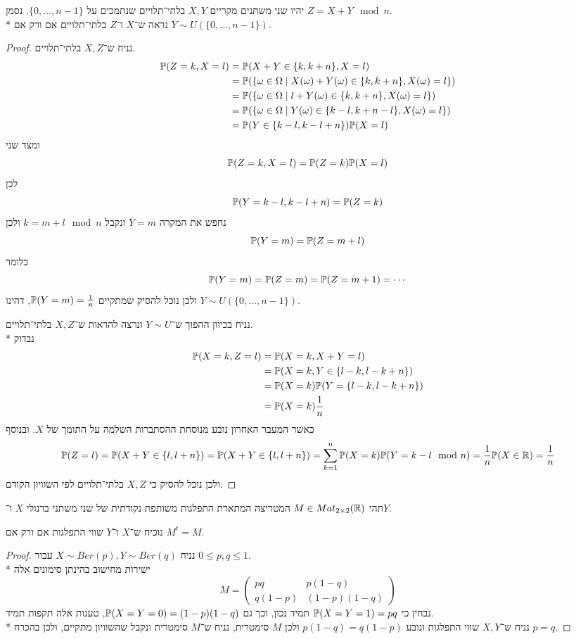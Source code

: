 \question{}
יהיו שני משתנים מקריים $X, Y$ בלתי־תלויים שנתמכים על $\{0, \dots, n - 1\}$. נסמן $Z = X + Y \mod n$. \\*
נראה ש־$X$ ו־$Z$ בלתי־תלויים אם ורק אם $Y \sim U(\{0, \dots, n - 1\})$.
\begin{proof}
	נניח ש־$X, Z$ בלתי־תלויים.
	\begin{align*}
		\mathbb{P}(Z = k, X = l)
		& = \mathbb{P}(X + Y \in \{k, k + n\}, X = l) \\
		& = \mathbb{P}(\{\omega \in \Omega \mid X(\omega) + Y(\omega) \in \{k, k + n\}, X(\omega) = l\}) \\
		& = \mathbb{P}(\{\omega \in \Omega \mid l + Y(\omega) \in \{k, k + n\}, X(\omega) = l\}) \\
		& = \mathbb{P}(\{\omega \in \Omega \mid Y(\omega) \in \{k - l, k + n - l\}, X(\omega) = l\}) \\
		& = \mathbb{P}(Y \in \{k - l, k - l + n\}) \mathbb{P}(X = l) \\
	\end{align*}
	ומצד שני
	\[
		\mathbb{P}(Z = k, X = l)
		= \mathbb{P}(Z = k) \mathbb{P}(X = l)
	\]
	לכן
	\[
		\mathbb{P}(Y = k - l, k - l + n)
		= \mathbb{P}(Z = k)
	\]
	נחפש את המקרה $Y = m$ ונקבל $k = m + l \mod n$ ולכן
	\[
		\mathbb{P}(Y = m) = \mathbb{P}(Z = m + l)
	\]
	כלומר
	\[
		\mathbb{P}(Y = m) = \mathbb{P}(Z = m) = \mathbb{P}(Z = m + 1) = \cdots
	\]
	ולכן נוכל להסיק שמתקיים $\mathbb{P}(Y = m) = \frac{1}{n}$, דהינו $Y \sim U(\{0, \dots, n - 1\})$.

	נניח בכיוון ההפוך ש־$Y \sim U$ ונרצה להראות ש־$X, Z$ בלתי־תלויים. \\*
	נבדוק
	\begin{align*}
		\mathbb{P}(X = k, Z = l)
		& = \mathbb{P}(X = k, X + Y = l) \\
		& = \mathbb{P}(X = k, Y \in \{l - k, l - k + n\}) \\
		& = \mathbb{P}(X = k) \mathbb{P}(Y = \{l - k, l - k + n\}) \\
		& = \mathbb{P}(X = k) \frac{1}{n}
	\end{align*}
	כאשר המעבר האחרון נובע מנוסחת ההסתברות השלמה על התומך של $X$.
	ובנוסף
	\[
		\mathbb{P}(Z = l)
		= \mathbb{P}(X + Y \in \{l, l + n\})
		= \mathbb{P}(X + Y \in \{l, l + n\})
		= \sum_{k = 1}^{n} \mathbb{P}(X = k) \mathbb{P}(Y = k - l \mod n)
		= \frac{1}{n} \mathbb{P}(X \in \mathbb{R})
		= \frac{1}{n}
	\]
	ולכן נוכל להסיק כי $X, Z$ בלתי־תלויים לפי השוויון הקודם.
\end{proof}

\question{}
תהי $M \in Mat_{2 \times 2}(\mathbb{R})$ המטריצה המתארת התפלגות משותפת נקודתית של שני משתני ברנולי $X$ ו־$Y$.

\subquestion{}
נוכיח ש־$X$ ו־$Y$ שווי התפלגות אם ורק אם $M^t = M$.
\begin{proof}
	נניח $X \sim Ber(p), Y \sim Ber(q)$ עבור $0 \le p, q \le 1$. \\*
	ישירות מחישוב בהינתן סימונים אלה
	\[
		M = \begin{pmatrix}
			p q & p (1 - q) \\
			q (1 - p) & (1 - p)(1 - q)
		\end{pmatrix}
	\]
	נבחין כי $\mathbb{P}(X = Y = 1) = pq$ תמיד נכון, וכך גם $\mathbb{P}(X = Y = 0) = (1 - p)(1 - q)$, טענות אלה תקפות תמיד. \\*
	נניח ש־$X, Y$ שווי התפלגות ונובע $p(1 - q) = q(1 - p)$ ולכן $M$ סימטרית, נניח ש־$M$ סימטרית ונקבל שהשוויון מתקיים, ולכן בהכרח $p = q$.
\end{proof}

